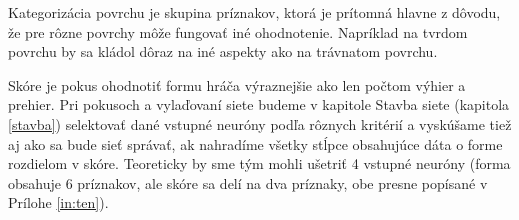 Kategorizácia povrchu je skupina príznakov, ktorá je prítomná hlavne z dôvodu, že pre rôzne povrchy môže fungovať iné ohodnotenie. Napríklad na tvrdom povrchu by sa kládol dôraz na iné aspekty ako na trávnatom povrchu.

Skóre je pokus ohodnotiť formu hráča výraznejšie ako len počtom výhier a prehier. Pri pokusoch a vylaďovaní siete budeme v kapitole Stavba siete (kapitola \ref{stavba}) selektovať dané vstupné neuróny podľa rôznych kritérií a vyskúšame tiež aj ako sa bude sieť správať, ak nahradíme všetky stĺpce obsahujúce dáta o forme rozdielom v skóre.
Teoreticky by sme tým mohli ušetriť 4 vstupné neuróny (forma obsahuje 6 príznakov, ale skóre sa delí na dva príznaky, obe presne popísané v Prílohe \ref{in:ten}).